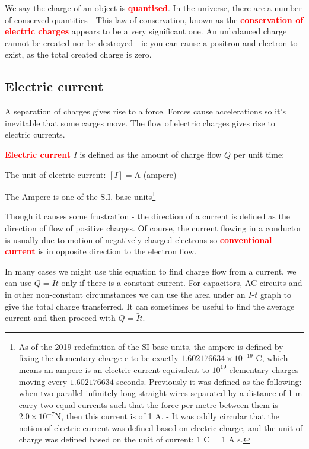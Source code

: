 \documentclass[a4paper,12pt]{book}
\newcommand{\cmt}{}
\newenvironment{ilight}
  {\centering
  	\vspace*{6pt}
  	\begin{tcolorbox}[colframe=Gray,colback=LightGrey!15]
  \setlength{\baselineskip}{\baselineskip}%
  }
  {\end{tcolorbox}\vspace*{-4pt}}
\newcommand{\keypoint}[1]{\textbf{\textcolor{red}{#1}}}
\newcommand{\tcbhighmath}[1]{\boxed{#1}}
\newcommand{\keypoint}[1]{\textbf{\textcolor{red}{#1}}}
\newcommand{\cmt}{}
\begin{document}
We say the charge of an object is \keypoint{quantised}. In the universe, there are a number of conserved quantities - This law of conservation, known as the \keypoint{conservation of electric charges} appears to be a very significant one. An unbalanced charge cannot be created nor be destroyed - ie you can cause a positron and electron to exist, as the total created charge is zero.

\subsection{Electric current}

A separation of charges gives rise to a force. Forces cause accelerations so it's inevitable that some carges move. The flow of electric charges gives rise to electric currents.

\begin{ilight}
	\centering \keypoint{Electric current} $I$ is defined as the amount of charge flow $Q$ per unit time: \begin{empheq}[box=\tcbhighmath]{equation*}{I=\frac{\Delta Q}{\Delta t}}\end{empheq}\index{current}
\end{ilight}

\cmt The unit of electric current: $[I] = $ (ampere)

The Ampere is one of the S.I. base units\footnote{As of the 2019 redefinition of the SI base units, the ampere is defined by fixing the elementary charge e to be exactly $1.602176634 \times 10^{-19}$ C, which means an ampere is an electric current equivalent to $10^{19}$ elementary charges moving every $1.602176634$ seconds. Previously it was defined as the following: when two parallel infinitely long straight wires separated by a distance of 1 m carry two equal currents such that the force per metre between them is $2.0\times10^{-7}$N, then this current is of 1 A. - It was oddly circular that the notion of electric current was defined based on electric charge, and the unit of charge was defined based on the unit of current: 1 C = 1 A s.}

Though it causes some frustration - the direction of a current is defined as the direction of flow of positive charges. Of course, the current flowing in a conductor is usually due to motion of negatively-charged electrons so \keypoint{conventional current} is in opposite direction to the electron flow. 

In many cases we might use this equation to find charge flow from a current, we can use  $Q=It$ only if there is a constant current. For capacitors, AC circuits and in other non-constant circumstances we can use the area under an $I$-$t$ graph to give the total charge transferred.
It can sometimes be useful to find the average current and then proceed with $Q=\bar{I}t$. 
\end{document}
